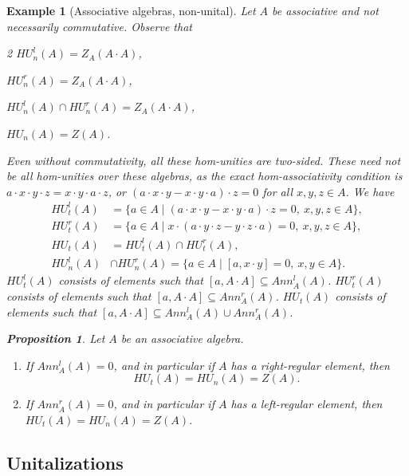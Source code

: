 \documentclass[12pt]{article}
\newtheorem{proposition}[theorem]{Proposition}
\newtheorem{example}[theorem]{Example}
\begin{document}
		
		\begin{example}[Associative algebras, non-unital]
			
			Let $A$ be associative and not necessarily commutative. Observe that
			\begin{multicols}{2}
				$HU_n^l(A)=Z_A(A\cdot A)$,
				
				$HU_n^r(A)=Z_A(A\cdot A)$,
				
				$HU_n^l(A)\cap HU_n^r(A)=Z_A(A\cdot A)$,
				
				$HU_n(A)=Z(A)$.
			\end{multicols}
			Even without commutativity, all these hom-unities are two-sided. These need not be all hom-unities over these algebras, as the exact hom-associativity condition is $a\cdot x\cdot y\cdot z=x\cdot y\cdot a\cdot z$, or $(a\cdot x\cdot y-x\cdot y\cdot a)\cdot z=0$ for all $x,y,z\in A$.  We have
			\begin{align*}
				HU_t^l(A)&=\{a\in A\mid (a\cdot x\cdot y-x\cdot y\cdot a)\cdot z=0,\ x,y,z\in A\}, \\
				HU_t^r(A)&=\{a\in A\mid x\cdot (a\cdot y\cdot z-y\cdot z\cdot a)=0,\ x,y,z\in A\},  \\
				HU_t(A)&=HU_t^l(A)\cap HU_t^r(A),\\
				HU_n^l(A)&\cap HU_n^r(A)=\{a\in A\mid [a,x\cdot y]=0,\ x,y\in A\}.
			\end{align*}
			$HU_t^l(A)$ consists of elements such that $[a,A\cdot A]\subseteq Ann_A^l(A)$.
			$HU_t^r(A)$ consists of elements such that $[a,A\cdot A]\subseteq Ann_A^r(A)$. $HU_t(A)$ consists of elements such that $[a,A\cdot A]\subseteq Ann_A^l(A)\cup Ann_A^r(A)$.
			
			\begin{proposition}\label{prop:HUnA_assoc_no_ann}
				Let $A$ be an associative algebra.
				\begin{enumerate}[label=\textnormal{(\roman*)}]
					\item If $Ann_A^l(A)=0$, and in particular if $A$ has a right-regular element, then $$HU_t(A)=HU_n(A)=Z(A).$$
					\item If $Ann_A^r(A)=0$, and in particular if $A$ has a left-regular element, then $HU_t(A)=HU_n(A)=Z(A)$.
				\end{enumerate}
			\end{proposition}
			
		\end{example}
		
		
		\subsection{Unitalizations}\label{ssec:unitalizations}
		
\end{document}
